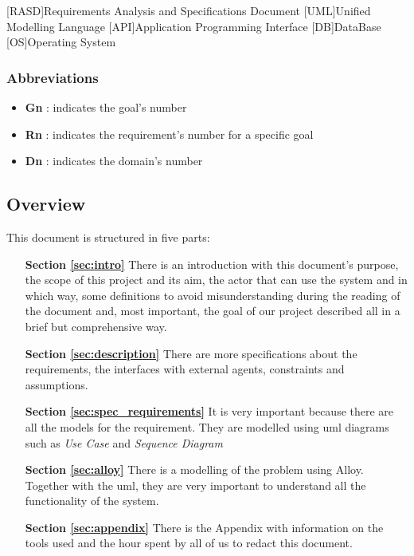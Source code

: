 \begin{acronym}[RASD] %

[RASD]{Requirements Analysis and Specifications Document}
[UML]{Unified Modelling Language}
[API]{Application Programming Interface}
[DB]{DataBase}
[OS]{Operating System}

\end{acronym}

\subsubsection{Abbreviations} \label{abbre}
\begin{itemize}
\item \textbf{Gn} : indicates the goal's number
\item \textbf{Rn} : indicates the requirement's number for a specific goal
\item \textbf{Dn} : indicates the domain's number
\end{itemize}


\subsection{Overview} \label{subsec:overview}
This document is structured in five parts:
\begin{itemize}
\item[\textbf{Section \ref{sec:intro}}]There is an introduction with this document's purpose, the scope of this project and its aim, the actor that can use the system and in which way, some definitions to avoid misunderstanding during the reading of the document and, most important, the goal of our project described all in a brief but comprehensive way.  
\item[\textbf{Section \ref{sec:description}}]There are more specifications about the requirements, the interfaces with external agents, constraints and assumptions.
\item[\textbf{Section \ref{sec:spec_requirements}}]It is very important because there are all the models for the requirement. They are modelled using \acs{uml} diagrams such as \emph{Use Case} and \emph{Sequence Diagram}
\item[\textbf{Section \ref{sec:alloy}}]There is a modelling of the problem using Alloy. Together with the \acs{uml}, they are very important to understand all the functionality of the system.  
\item[\textbf{Section \ref{sec:appendix}}]There is the Appendix with information on the tools used and the hour spent by all of us to redact this document.
\end{itemize}

